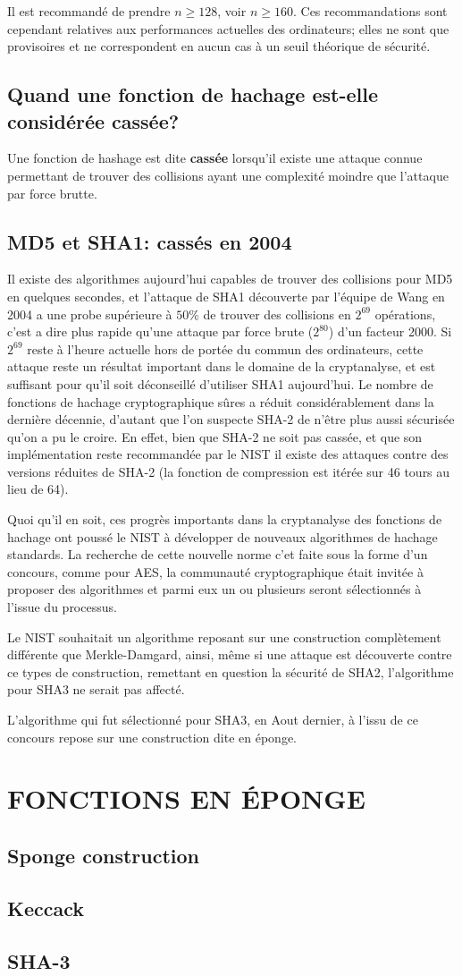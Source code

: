 \documentclass[10.5pt, a4paper, twoside, openright]{report}
\begin{document}
Il est recommandé de prendre $n \ge 128$, voir $n\ge 160$. Ces recommandations sont cependant relatives aux performances actuelles des ordinateurs; elles ne sont que provisoires et ne correspondent en aucun cas à un seuil théorique de sécurité.

\section{Quand une fonction de hachage est-elle considérée cassée?}
Une fonction de hashage est dite \textbf{cassée} lorsqu'il existe une attaque connue permettant de trouver des collisions ayant une complexité moindre que l'attaque par force brutte. 

\section{MD5 et SHA1: cassés en 2004}
Il existe des algorithmes aujourd’hui capables de trouver des collisions pour MD5 en quelques secondes, et l’attaque de SHA1 découverte par l’équipe de Wang en 2004 a une probe supérieure à $50\%$ de trouver des collisions en $2^{69}$ opérations, c’est a dire plus rapide qu’une attaque par force brute ($2^80$) d’un facteur 2000.
Si $2^{69}$ reste à l’heure actuelle hors de portée du commun des ordinateurs, cette attaque reste un résultat important dans le domaine de la cryptanalyse, et est suffisant pour qu’il soit déconseillé d’utiliser SHA1 aujourd’hui.
Le nombre de fonctions de hachage cryptographique sûres a réduit considérablement dans la dernière décennie, d’autant que l’on suspecte SHA-2 de n’être plus aussi sécurisée qu’on a pu le croire. En effet, bien que SHA-2 ne soit pas cassée, et que son implémentation reste recommandée par le NIST il existe des attaques contre des versions réduites de SHA-2 (la fonction de compression est itérée sur 46 tours au lieu de 64).

Quoi qu'il en soit, ces progrès importants dans la cryptanalyse des fonctions de hachage ont poussé le NIST à développer de nouveaux algorithmes de hachage standards. La recherche de cette nouvelle norme c'et faite sous la forme d'un concours, comme pour AES, la communauté cryptographique était invitée à proposer des algorithmes et parmi eux un ou plusieurs seront sélectionnés à l’issue du processus.

Le NIST souhaitait un algorithme reposant sur une construction complètement différente que Merkle-Damgard, ainsi, même si une attaque est découverte contre ce types de construction, remettant en question la sécurité de SHA2, l'algorithme pour SHA3 ne serait pas affecté.
 
L'algorithme qui fut sélectionné pour SHA3, en Aout dernier, à l'issu de ce concours repose sur une construction dite en éponge. 

\chapter{FONCTIONS EN ÉPONGE}
\section{Sponge construction}
\section{Keccack}
\section{SHA-3}
\end{document}
